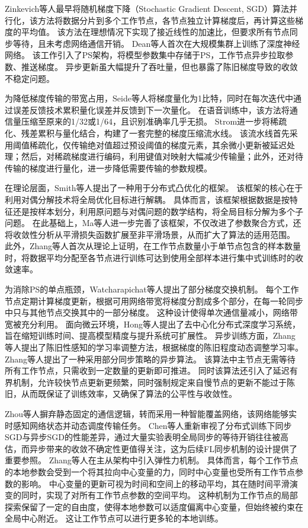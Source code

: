 \documentclass[master, vlined]{DissertUESTC}
\begin{document}
	Zinkevich等人最早将随机梯度下降（Stochastic Gradient Descent, SGD）算法并行化，该方法将数据分片到多个工作节点，各节点独立计算梯度后，再计算这些梯度的平均值。
	该方法在理想情况下实现了接近线性的加速比，但要求所有节点同步等待，且未考虑网络通信开销。
	Dean等人首次在大规模集群上训练了深度神经网络。
	该工作引入了PS架构，将模型参数集中存储于PS，工作节点异步拉取参数、推送梯度。
	异步更新虽大幅提升了吞吐量，但也暴露了陈旧梯度导致的收敛不稳定问题。

	为降低梯度传输的带宽占用，Seide等人将梯度量化为1比特，同时在每次迭代中通过误差反馈技术累积量化误差并反馈到下一次量化。
	在语音训练中，该方法将通信量压缩至原来的1/32或1/64，且识别准确率几乎无损。
	Strom进一步将稀疏化、残差累积与量化结合，构建了一套完整的梯度压缩流水线。
	该流水线首先采用阈值稀疏化，仅传输绝对值超过预设阈值的梯度元素，其余微小更新被延迟处理；然后，对稀疏梯度进行编码，利用键值对映射大幅减少传输量；此外，还对待传输的梯度进行量化，进一步降低需要传输的参数规模。

	在理论层面，Smith等人提出了一种用于分布式凸优化的框架。
	该框架的核心在于利用对偶分解技术将全局优化目标进行解耦。
	具体而言，该框架根据数据是按特征还是按样本划分，利用原问题与对偶问题的数学结构，将全局目标分解为多个子问题。
	在此基础上，Ma等人进一步完善了该框架，不仅改进了参数聚合方式，还将收敛性分析从平滑损失函数扩展至非平滑场景，从而扩大了算法的适用范围。
	此外，Zhang等人首次从理论上证明，在工作节点数量小于单节点包含的样本数量时，将数据平均分配至各节点进行训练可达到使用全部样本进行集中式训练时的收敛速率。

	为消除PS的单点瓶颈，Watcharapichat等人提出了部分梯度交换机制。
	每个工作节点定期计算梯度更新，根据可用网络带宽将梯度分割成多个部分，在每一轮同步中只与其他节点交换其中的一部分梯度。
	这种设计使得单次通信量减小，网络带宽被充分利用。
	面向微云环境，Hong等人提出了去中心化分布式深度学习系统，旨在缩短训练时间、提高模型精度与提升系统可扩展性。
	异步训练方面，Zhang等人提出了陈旧性感知的学习率调整方法，根据梯度的陈旧程度动态调整学习率。
	Zhang等人提出了一种采用部分同步策略的异步算法。
	该算法中主节点无需等待所有工作节点，只需收到一定数量的更新即可推进。
	同时该算法还引入了延迟有界机制，允许较快节点更新更频繁，同时强制规定来自慢节点的更新不能过于陈旧，从而既保证了训练效率，又确保了算法的公平性与收敛性。

	Zhou等人摒弃静态固定的通信逻辑，转而采用一种智能覆盖网络，该网络能够实时感知网络状态并动态调度传输任务。
	Chen等人重新审视了分布式训练下同步SGD与异步SGD的性能差异，通过大量实验表明全局同步的等待开销往往被高估，而异步带来的收敛不确定性更值得关注，这为后续FL同步机制的设计提供了重要参照。
	Zhang等人在主从架构中引入弹性力机制。
	具体而言，每个工作节点的本地参数会受到一个将其拉向中心变量的力，同时中心变量也受所有工作节点参数的影响。
	中心变量的更新可视为时间和空间上的移动平均，其在随时间平滑演变的同时，实现了对所有工作节点参数的空间平均。
	这种机制为工作节点的局部探索保留了一定的自由度，使得本地参数可以适度偏离中心变量，但始终被约束在全局中心附近。
	这让工作节点可以进行更多轮的本地训练。
\end{document}
